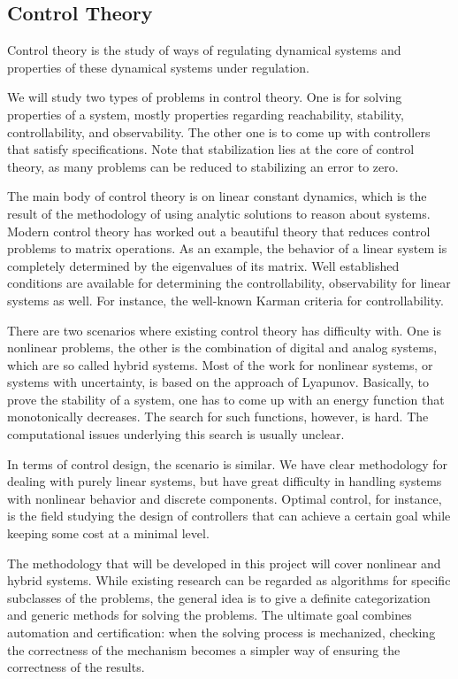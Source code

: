 \documentclass[10pt]{article}
\theoremstyle{definition}
\begin{document}
\subsection{Control Theory} 

Control theory is the study of ways of regulating dynamical systems and properties of these dynamical systems under regulation. 

We will study two types of problems in control theory. One is for solving properties of a system, mostly properties regarding reachability, stability, controllability, and observability. The other one is to come up with controllers that satisfy specifications. Note that stabilization lies at the core of control theory, as many problems can be reduced to stabilizing an error to zero. 

The main body of control theory is on linear constant dynamics, which is the result of the methodology of using analytic solutions to reason about systems. Modern control theory has worked out a beautiful theory that reduces control problems to matrix operations. As an example, the behavior of a linear system is completely determined by the eigenvalues of its matrix. Well established conditions are available for determining the controllability, observability for linear systems as well. For instance, the well-known Karman criteria for controllability. 

There are two scenarios where existing control theory has difficulty with. One is nonlinear problems, the other is the combination of digital and analog systems, which are so called hybrid systems. Most of the work for nonlinear systems, or systems with uncertainty, is based on the approach of Lyapunov. Basically, to prove the stability of a system, one has to come up with an energy function that monotonically decreases. The search for such functions, however, is hard. The computational issues underlying this search is usually unclear.~\cite{}

In terms of control design, the scenario is similar. We have clear methodology for dealing with purely linear systems, but have great difficulty in handling systems with nonlinear behavior and discrete components. Optimal control, for instance, is the field studying the design of controllers that can achieve a certain goal while keeping some cost at a minimal level. 

The methodology that will be developed in this project will cover nonlinear and hybrid systems. While existing research can be regarded as algorithms for specific subclasses of the problems, the general idea is to give a definite categorization and generic methods for solving the problems. The ultimate goal combines automation and certification: when the solving process is mechanized, checking the correctness of the mechanism becomes a simpler way of ensuring the correctness of the results. 
\end{document}

